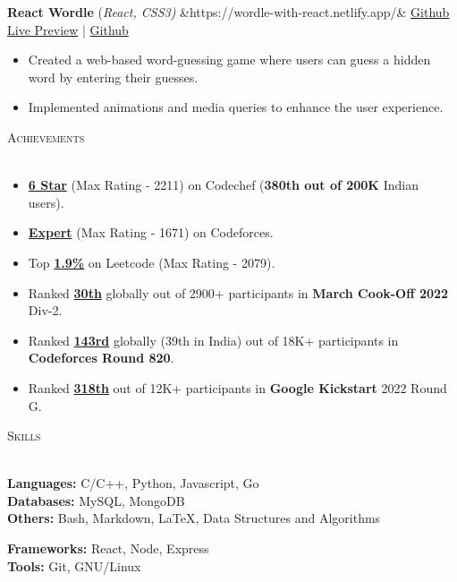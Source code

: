 \documentclass[a4paper]{article}
\newcommand{\sectionSep} { \vspace{3mm} }
\newcommand{\lineunder} {
    \vspace*{-8pt} \\
    \hspace*{-15pt} \hrulefill \\
}
\newcommand{\header} [1] {
    {\hspace*{-18pt}\vspace*{6pt} {
        \fontfamily{qcs}\selectfont \large \scshape #1
    }}
    \vspace*{-6pt} \lineunder
    \vspace{0.5mm}
}
\newcommand{\projectItem}[5]{
    {\textbf{#1}} {(\sl #2)}\hfill
    \ifx&#3&%
    \href{#4}{Github}\\
    \else
    \href{#3}{Live Preview} | \href{#4}{Github}\\
    \fi
    \begin{itemize}
        #5
    \end{itemize}
}
\begin{document}
\projectItem{React Wordle}{React, CSS3}{https://wordle-with-react.netlify.app/}{https://github.com/AkshatAggarwal14/react-wordle}{
    \item Created a web-based word-guessing game where users can guess a hidden word by entering their guesses.
    \item Implemented animations and media queries to enhance the user experience.
}
\sectionSep


\header{Achievements}
\begin{itemize}
    \item \textbf{\href{https://www.codechef.com/users/master_mind14}{6 Star}} (Max Rating - 2211) on Codechef (\textbf{380th out of 200K} Indian users).
    \item \textbf{\href{https://codeforces.com/profile/master._.mind}{Expert}} (Max Rating - 1671) on Codeforces.
    \item Top \textbf{\href{https://leetcode.com/AkshatAggarwal14/}{1.9\%}} on Leetcode (Max Rating - 2079).
    \item Ranked \textbf{\href{https://www.codechef.com/rankings/COOK139B?itemsPerPage=100&order=asc&page=1&search=master_mind14&sortBy=rank}{30th}} globally out of 2900+ participants in \textbf{March Cook-Off 2022} Div-2.
    \item Ranked \textbf{\href{https://codeforces.com/contest/1729/standings/participant/140098304\#p140098304}{143rd}} globally (39th in India) out of 18K+ participants in \textbf{Codeforces Round 820}.
    \item Ranked \textbf{\href{https://clist.by/standings/kick-start-round-g-31261744/?find_me=45689030}{318th}} out of 12K+ participants in \textbf{Google Kickstart} 2022 Round G.
\end{itemize}
\sectionSep


\header{Skills}
\begin{minipage}[t]{0.6\textwidth}
    \textbf{Languages:} C/C++, Python, Javascript, Go\\
    \textbf{Databases:} MySQL, MongoDB\\
    \textbf{Others:} Bash, Markdown, \LaTeX, Data Structures and Algorithms
\end{minipage}
\hfill
\begin{minipage}[t]{0.33\textwidth}
    \textbf{Frameworks:} React, Node, Express\\
    \textbf{Tools:} Git, GNU/Linux
\end{minipage}
\sectionSep
\end{document}
